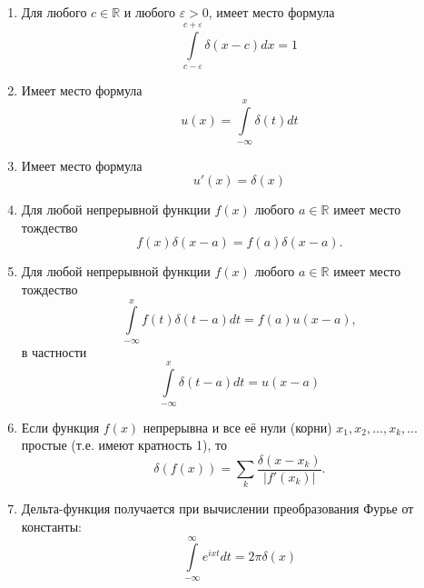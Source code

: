 \begin{prop}
\label{prop:13.5}
\begin{enumerate}
	\item  Для любого $c \in \mathbb{R}$ и любого $\varepsilon > 0$, имеет место формула
\begin{equation*}
	\int\limits_{c-\varepsilon}^{c+\varepsilon}\delta(x-c)dx=1
\end{equation*}
	\item Имеет место формула \begin{equation*}
		u(x)=\int\limits_{-\infty}^x\delta(t)dt
	\end{equation*}
	\item Имеет место формула \begin{equation*}
		u'(x)=\delta(x)
	\end{equation*}
	\item Для любой непрерывной функции $f(x)$ любого $a \in \mathbb{R}$ имеет место тождество
	\begin{equation*}
		f(x)\delta(x-a)=f(a)\delta(x-a).
	\end{equation*}
	\item Для любой непрерывной функции $f(x)$ любого $a \in \mathbb{R}$ имеет место тождество
	\begin{equation*}
		\int\limits_{-\infty}^xf(t)\delta(t-a)dt=f(a)u(x-a),
	\end{equation*}
	в частности
	\begin{equation*}
		\int\limits_{-\infty}^x\delta(t-a)dt=u(x-a)
	\end{equation*}
	\item Если функция $f(x)$ непрерывна и все её нули (корни) $x_1, x_2,\dots , x_k, \dots$ простые (т.е. имеют кратность 1), то
	\begin{equation*}
		\delta(f(x))=\sum\limits_k\frac{\delta(x-x_k)}{|f'(x_k)|}.
	\end{equation*}
	\item Дельта-функция получается при вычислении преобразования Фурье
	от константы:
	\begin{equation*}
		\int\limits_{-\infty}^{\infty}e^{ixt}dt=2\pi \delta(x)
	\end{equation*}
\end{enumerate}
\end{prop}

